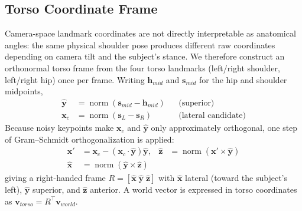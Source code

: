 \documentclass[conference]{IEEEtran}
\begin{document}
\subsection{Torso Coordinate Frame}
Camera-space landmark coordinates are not directly interpretable as
anatomical angles: the same physical shoulder pose produces different
raw coordinates depending on camera tilt and the subject's stance. We
therefore construct an orthonormal torso frame from the four torso
landmarks (left/right shoulder, left/right hip) once per frame. Writing
$\mathbf{h}_{mid}$ and $\mathbf{s}_{mid}$ for the hip and shoulder
midpoints,
\begin{align}
\hat{\mathbf{y}} &= \operatorname{norm}(\mathbf{s}_{mid} - \mathbf{h}_{mid}) &&\text{(superior)}\\
\mathbf{x}_{c} &= \operatorname{norm}(\mathbf{s}_{L} - \mathbf{s}_{R}) &&\text{(lateral candidate)}
\end{align}
Because noisy keypoints make $\mathbf{x}_c$ and $\hat{\mathbf{y}}$ only
approximately orthogonal, one step of Gram--Schmidt orthogonalization is
applied:
\begin{align}
\mathbf{x}' &= \mathbf{x}_c - (\mathbf{x}_c\cdot\hat{\mathbf{y}})\hat{\mathbf{y}}, &
\hat{\mathbf{z}} &= \operatorname{norm}(\mathbf{x}' \times \hat{\mathbf{y}}) \\
\hat{\mathbf{x}} &= \operatorname{norm}(\hat{\mathbf{y}} \times \hat{\mathbf{z}}) &&
\end{align}
giving a right-handed frame $R = [\hat{\mathbf{x}}\;\hat{\mathbf{y}}\;\hat{\mathbf{z}}]$
with $\hat{\mathbf{x}}$ lateral (toward the subject's left),
$\hat{\mathbf{y}}$ superior, and $\hat{\mathbf{z}}$ anterior. A world
vector is expressed in torso coordinates as $\mathbf{v}_{torso} =
R^{\!\top}\mathbf{v}_{world}$.
\end{document}
